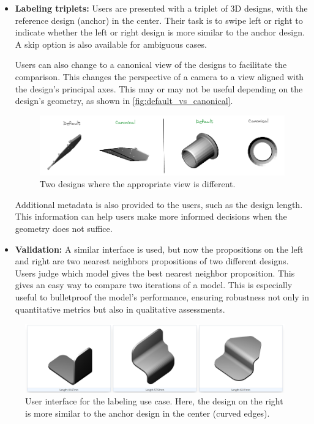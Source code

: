 \begin{itemize}
  \item \textbf{Labeling triplets:} Users are presented with a triplet of 3D designs, with the reference design (anchor) in the center. Their task is to swipe left or right to indicate whether the left or right design is more similar to the anchor design. A skip option is also available for ambiguous cases.
  
  Users can also change to a canonical view of the designs to facilitate the comparison. This changes the perspective of a camera to a view aligned with the design's principal axes. This may or may not be useful depending on the design's geometry, as shown in \autoref{fig:default_vs_canonical}.

\begin{figure}[]
  \centering
  \includegraphics[width=\columnwidth]{images/default_vs_canonical.png}
  \caption{Two designs where the appropriate view is different.}
  \label{fig:default_vs_canonical}
\end{figure}

  Additional metadata is also provided to the users, such as the design length. This information can help users make more informed decisions when the geometry does not suffice.
  \item \textbf{Validation:} A similar interface is used, but now the propositions on the left and right are two nearest neighbors propositions of two different designs. Users judge which model gives the best nearest neighbor proposition. This gives an easy way to compare two iterations of a model. This is especially useful to bulletproof the model's performance, ensuring robustness not only in quantitative metrics but also in qualitative assessments.
  
\end{itemize}

\begin{figure}[]
  \centering
  \includegraphics[width=0.8\columnwidth]{images/tinder3d_labeling.png}
  \caption{User interface for the labeling use case. Here, the design on the right is more similar to the anchor design in the center (curved edges).}
  \label{fig:labeling_use_case}
\end{figure}

